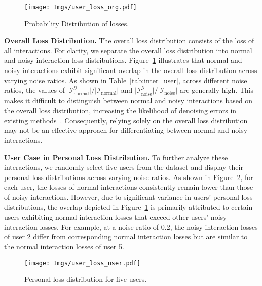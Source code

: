 


\begin{figure}
    \centering
    \texttt{[image: Imgs/user\_loss\_org.pdf]}
    \caption{Probability Distribution of losses.}
    \label{fig:user_loss_org}
\end{figure}




\textbf{Overall Loss Distribution.} The overall loss distribution consists of the loss of all interactions. For clarity, we separate the overall loss distribution into normal and noisy interaction loss distributions. Figure~\ref{fig:user_loss_org} illustrates that normal and noisy interactions exhibit significant overlap in the overall loss distribution across varying noise ratios. As shown in Table~\ref{tab:inter_user}, across different noise ratios, the values of $\vert \mathcal{I}^{\mathcal{G}}_{\text{normal}} \vert / \vert \mathcal{I}_{\text{normal}} \vert$ and $\vert \mathcal{I}^{\mathcal{G}}_{\text{noise}} \vert / \vert \mathcal{I}_{\text{noise}} \vert$ are generally high. This makes it difficult to distinguish between normal and noisy interactions based on the overall loss distribution, increasing the likelihood of denoising errors in existing methods~\cite{wang2021denoising, he2024double, gao2022selfguided, lin2023autodenoise}. Consequently, relying solely on the overall loss distribution may not be an effective approach for differentiating between normal and noisy interactions.

\textbf{User Case in Personal Loss Distribution.} To further analyze these interactions, we randomly select five users from the dataset and display their personal loss distributions across varying noise ratios. As shown in Figure~\ref{fig:user_loss}, for each user, the losses of normal interactions consistently remain lower than those of noisy interactions. However, due to significant variance in users' personal loss distributions, the overlap depicted in Figure~\ref{fig:user_loss_org} is primarily attributed to certain users exhibiting normal interaction losses that exceed other users' noisy interaction losses. For example, at a noise ratio of 0.2, the noisy interaction losses of user 2 differ from corresponding normal interaction losses but are similar to the normal interaction losses of user 5.


\begin{figure}
    \centering
    \texttt{[image: Imgs/user\_loss\_user.pdf]}
    \caption{Personal loss distribution for five users.}
    \label{fig:user_loss}
\end{figure}

